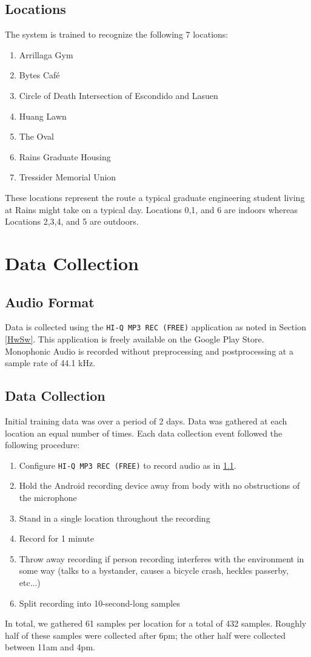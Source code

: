 \documentclass[journal]{IEEEtran}
\begin{document}
\subsection{Locations}
The system is trained to recognize the following 7 locations:
\begin{enumerate}[label=\arabic*.]
\addtocounter{enumi}{-1}
\item Arrillaga Gym
\item Bytes Caf\'e
\item Circle of Death
    \subitem Intersection of Escondido and Lasuen
\item Huang Lawn
\item The Oval
\item Rains Graduate Housing
\item Tressider Memorial Union
\end{enumerate}
These locations represent the route a typical graduate engineering student living at Rains might take on a typical day. Locations 0,1, and 6 are indoors whereas Locations 2,3,4, and 5 are outdoors.


\section{Data Collection}\label{Data}
\subsection{Audio Format}\label{AudioFormat}
Data is collected using the \texttt{HI-Q MP3 REC (FREE)} application as noted in Section \ref{HwSw}. This application is freely available on the Google Play Store. Monophonic Audio is recorded without preprocessing and postprocessing at a sample rate of 44.1 kHz.
\subsection{Data Collection}
Initial training data was over a period of 2 days. Data was gathered at each location an equal number of times. Each data collection event followed the following procedure:
\begin{enumerate}
\item Configure \texttt{HI-Q MP3 REC (FREE)} to record audio as in \ref{AudioFormat}.
\item Hold the Android recording device away from body with no obstructions of the microphone
\item Stand in a single location throughout the recording
\item Record for 1 minute
\item Throw away recording if person recording interferes with the environment in some way (talks to a bystander, causes a bicycle crash, heckles passerby, etc...) 
\item Split recording into 10-second-long samples
\end{enumerate}
In total, we gathered 61 samples per location for a total of 432 samples. Roughly half of these samples were collected after 6pm; the other half were collected between 11am and 4pm.
\end{document}
